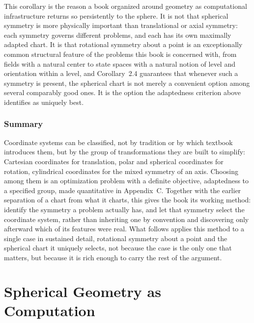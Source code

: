 \documentclass[11pt,fleqn]{book}
\numberwithin{equation}{chapter}
\theoremstyle{plain}
\theoremstyle{definition}
\theoremstyle{remark}
\begin{document}
This corollary is the reason a book organized around geometry as computational infrastructure returns so persistently to the sphere. It is not that spherical symmetry is more physically important than translational or axial symmetry: each symmetry governs different problems, and each has its own maximally adapted chart. It is that rotational symmetry about a point is an exceptionally common structural feature of the problems this book is concerned with, from fields with a natural center to state spaces with a natural notion of level and orientation within a level, and Corollary~2.4 guarantees that whenever such a symmetry is present, the spherical chart is not merely a convenient option among several comparably good ones. It is the option the adaptedness criterion above identifies as uniquely best.

\section{Summary}

Coordinate systems can be classified, not by tradition or by which textbook introduces them, but by the group of transformations they are built to simplify: Cartesian coordinates for translation, polar and spherical coordinates for rotation, cylindrical coordinates for the mixed symmetry of an axis. Choosing among them is an optimization problem with a definite objective, adaptedness to a specified group, made quantitative in Appendix~C. Together with the earlier separation of a chart from what it charts, this gives the book its working method: identify the symmetry a problem actually has, and let that symmetry select the coordinate system, rather than inheriting one by convention and discovering only afterward which of its features were real. What follows applies this method to a single case in sustained detail, rotational symmetry about a point and the spherical chart it uniquely selects, not because the case is the only one that matters, but because it is rich enough to carry the rest of the argument.


\part{Spherical Geometry as Computation}

\end{document}
